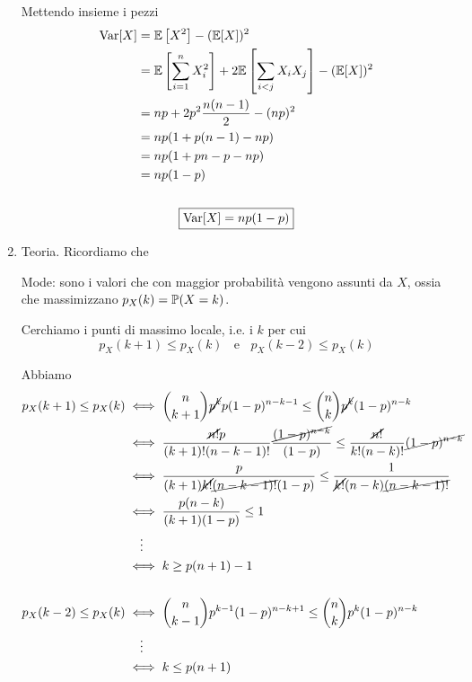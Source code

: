 \begin{enumerate}
\begin{tikzpicture}[x=0.75pt,y=0.75pt,yscale=-1,xscale=1]
\end{tikzpicture}


Mettendo insieme i pezzi
\begin{gather*}
\begin{aligned}
\Var[ X] & =\EE\left[ X^{2}\right] -(\EE[ X])^{2}\\
 & =\EE\left[\sum\limits _{i=1}^{n} X_{i}^{2}\right] +2\EE\left[\sum\limits _{i< j} X_{i} X_{j}\right] -(\EE[ X])^{2}\\
 & =np+2p^{2}\frac{n( n-1)}{2} -( np)^{2}\\
 & =np( 1+p( n-1) -np)\\
 & =np( 1+pn-p-np)\\
 & =np( 1-p)
\end{aligned}\\
\\
\boxed{\Var[ X] =np( 1-p)}
\end{gather*}
\item Teoria. Ricordiamo che

Mode: sono i valori che con maggior probabilità vengono assunti da $X$, ossia che massimizzano $p_{X}( k) =\PP( X=k)$.

Cerchiamo i punti di massimo locale, i.e. i $k$ per cui
\begin{equation*}
\boxed{p_{X}( k+1) \leq p_{X}( k) \ \ \ \ \text{e} \ \ \ \ p_{X}( k-2) \leq p_{X}( k)}
\end{equation*}

Abbiamo
\begin{align*}
p_{X}( k+1) \leq p_{X}( k) & \iff \binom{n}{k+1}\cancel{p^{k}} p( 1-p)^{n-k-1} \leq \binom{n}{k}\cancel{p^{k}}( 1-p)^{n-k}\\
 & \iff \frac{\cancel{n!} p}{( k+1) !( n-k-1) !}\frac{\cancel{( 1-p)^{n-k}}}{( 1-p)} \leq \frac{\cancel{n!}}{k!( n-k) !}\cancel{( 1-p)^{n-k}}\\
 & \iff \frac{p}{( k+1)\cancel{k!}\cancel{( n-k-1) !}( 1-p)} \leq \frac{1}{\cancel{k!}( n-k)\cancel{( n-k-1) !}}\\
 & \iff \frac{p( n-k)}{( k+1)( 1-p)} \leq 1\\
 & \quad\vdots \\
 & \iff k\geq p( n+1) -1\\
 & \\
p_{X}( k-2) \leq p_{X}( k) & \iff \binom{n}{k-1} p^{k-1}( 1-p)^{n-k+1} \leq \binom{n}{k} p^{k}( 1-p)^{n-k}\\
 & \quad\vdots \\
 & \iff k\leq p( n+1)
\end{align*}


\end{enumerate}
